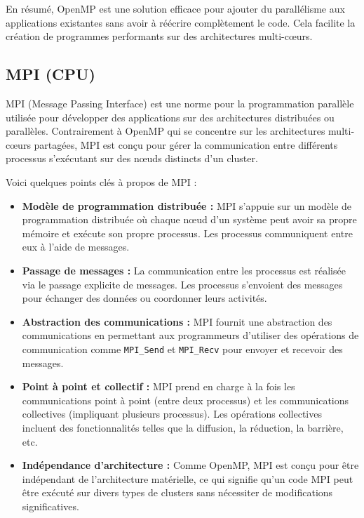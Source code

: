 \documentclass[10pt,a4paper]{article}
\begin{document}
En résumé, OpenMP est une solution efficace pour ajouter du parallélisme aux applications existantes sans avoir à réécrire complètement le code. Cela facilite la création de programmes performants sur des architectures multi-cœurs.


\subsection{MPI (CPU)}


MPI (Message Passing Interface) est une norme pour la programmation parallèle utilisée pour développer des applications sur des architectures distribuées ou parallèles. Contrairement à OpenMP qui se concentre sur les architectures multi-cœurs partagées, MPI est conçu pour gérer la communication entre différents processus s'exécutant sur des nœuds distincts d'un cluster.

Voici quelques points clés à propos de MPI :

\begin{itemize}
    
    \item \textbf{Modèle de programmation distribuée :} MPI s'appuie sur un modèle de programmation distribuée où chaque nœud d'un système peut avoir sa propre mémoire et exécute son propre processus. Les processus communiquent entre eux à l'aide de messages.
    
    \item \textbf{Passage de messages :} La communication entre les processus est réalisée via le passage explicite de messages. Les processus s'envoient des messages pour échanger des données ou coordonner leurs activités.
    
    \item \textbf{Abstraction des communications :} MPI fournit une abstraction des communications en permettant aux programmeurs d'utiliser des opérations de communication comme \verb|MPI_Send| et \verb|MPI_Recv| pour envoyer et recevoir des messages.
    
    \item \textbf{Point à point et collectif :} MPI prend en charge à la fois les communications point à point (entre deux processus) et les communications collectives (impliquant plusieurs processus). Les opérations collectives incluent des fonctionnalités telles que la diffusion, la réduction, la barrière, etc.
    
    \item \textbf{Indépendance d'architecture :} Comme OpenMP, MPI est conçu pour être indépendant de l'architecture matérielle, ce qui signifie qu'un code MPI peut être exécuté sur divers types de clusters sans nécessiter de modifications significatives.
\end{itemize}
\end{document}
